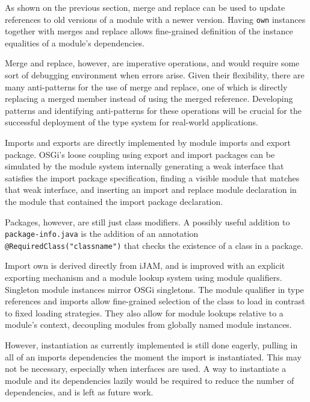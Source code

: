 As shown on the previous section, merge and replace can be used to 
update references to old versions of a module with a newer version.
Having \texttt{own} instances together with merges and replace allows
fine-grained definition of the instance equalities of a module's dependencies.

Merge and replace, however, are imperative operations, and would require
some sort of debugging environment when errors arise. Given their flexibility,
there are many anti-patterns for the use of merge and replace, one of which
is directly replacing a merged member instead of using the merged reference.
Developing patterns and identifying anti-patterns for these operations will be
crucial for the successful deployment of the type system for real-world applications.


Imports and exports are directly implemented by module imports and export package.
OSGi's loose coupling using export and import packages can be simulated by
the module system internally generating a weak interface that satisfies the import
package specification, finding a visible module that matches that weak interface, and
inserting an import and replace module declaration in the module that contained the import package
declaration.

Packages, however, are still just class modifiers. A possibly useful addition to 
\texttt{package-info.java} is the addition of an annotation \texttt{@RequiredClass("classname")}
that checks the existence of a class in a package.


Import own is derived directly from iJAM, and is improved with an explicit exporting 
mechanism and a module lookup system using module qualifiers. Singleton module instances mirror
OSGi singletons. The module qualifier in type references and
imports allow fine-grained selection of the class to load in contrast
to fixed loading strategies. They also allow for module lookups relative to
a module's context, decoupling modules from globally named module instances.

However, instantiation as currently implemented is still done eagerly, pulling in all
of an imports dependencies the moment the import is instantiated. This may not be necessary,
especially when interfaces are used. A way to instantiate a module and its dependencies 
lazily would be required to reduce the number of dependencies, and is left as future work.

